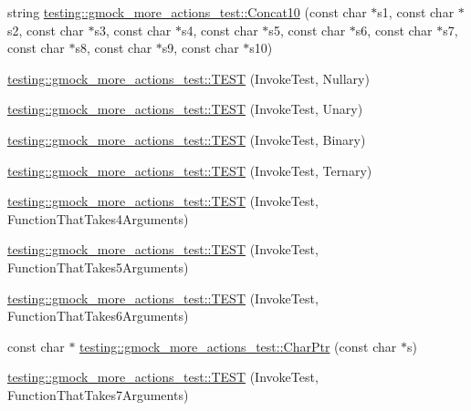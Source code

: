 \begin{DoxyCompactItemize}
\item 
string \hyperlink{namespacetesting_1_1gmock__more__actions__test_aba6aadf0de090a08bf9e467cdc09ffd8}{testing\+::gmock\+\_\+more\+\_\+actions\+\_\+test\+::\+Concat10} (const char $\ast$s1, const char $\ast$s2, const char $\ast$s3, const char $\ast$s4, const char $\ast$s5, const char $\ast$s6, const char $\ast$s7, const char $\ast$s8, const char $\ast$s9, const char $\ast$s10)
\item 
\hyperlink{namespacetesting_1_1gmock__more__actions__test_a9c5fbd26c6cc6ed31aed5bafb2fa8e5c}{testing\+::gmock\+\_\+more\+\_\+actions\+\_\+test\+::\+T\+E\+ST} (Invoke\+Test, Nullary)
\item 
\hyperlink{namespacetesting_1_1gmock__more__actions__test_a28b57a9f9d38574b7c033988ad528ddd}{testing\+::gmock\+\_\+more\+\_\+actions\+\_\+test\+::\+T\+E\+ST} (Invoke\+Test, Unary)
\item 
\hyperlink{namespacetesting_1_1gmock__more__actions__test_a906bd5cc7aa38e2cc861a9732481fce7}{testing\+::gmock\+\_\+more\+\_\+actions\+\_\+test\+::\+T\+E\+ST} (Invoke\+Test, Binary)
\item 
\hyperlink{namespacetesting_1_1gmock__more__actions__test_a424fb6113c6c1ab2157edf854a4ae9fe}{testing\+::gmock\+\_\+more\+\_\+actions\+\_\+test\+::\+T\+E\+ST} (Invoke\+Test, Ternary)
\item 
\hyperlink{namespacetesting_1_1gmock__more__actions__test_a17f41c1f7f180371d4d240089cdff0dd}{testing\+::gmock\+\_\+more\+\_\+actions\+\_\+test\+::\+T\+E\+ST} (Invoke\+Test, Function\+That\+Takes4\+Arguments)
\item 
\hyperlink{namespacetesting_1_1gmock__more__actions__test_a3b6b1b682295a1d04d57374445359e94}{testing\+::gmock\+\_\+more\+\_\+actions\+\_\+test\+::\+T\+E\+ST} (Invoke\+Test, Function\+That\+Takes5\+Arguments)
\item 
\hyperlink{namespacetesting_1_1gmock__more__actions__test_a9a6c89b83ba253838d05d7ee5da7d954}{testing\+::gmock\+\_\+more\+\_\+actions\+\_\+test\+::\+T\+E\+ST} (Invoke\+Test, Function\+That\+Takes6\+Arguments)
\item 
const char $\ast$ \hyperlink{namespacetesting_1_1gmock__more__actions__test_aa19ac39aaa785adeb8d7837d58b824f3}{testing\+::gmock\+\_\+more\+\_\+actions\+\_\+test\+::\+Char\+Ptr} (const char $\ast$s)
\item 
\hyperlink{namespacetesting_1_1gmock__more__actions__test_af4756ff87444dc6deb438a350ab5527f}{testing\+::gmock\+\_\+more\+\_\+actions\+\_\+test\+::\+T\+E\+ST} (Invoke\+Test, Function\+That\+Takes7\+Arguments)

\end{DoxyCompactItemize}
